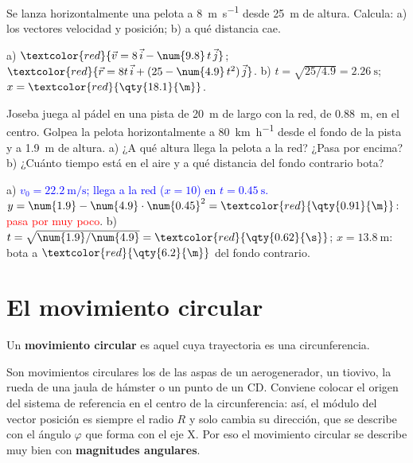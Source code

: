 \begin{exercise}
    Se lanza horizontalmente una pelota a \qty{8}{\m\per\s} desde \qty{25}{\m} de altura. Calcula: a) los vectores velocidad y
    posición; b) a qué distancia cae.
    \begin{solu}
        a) \(\textcolor{red}{\vec v = 8\,\ivec - \num{9.8}\,t\,\jvec}\); \(\textcolor{red}{\vec r = 8t\,\ivec + (25 - \num{4.9}\,t^2)\,\jvec}\).
        b) \(t = \sqrt{25/\num{4.9}} = \qty{2.26}{\s}\); \(x = \textcolor{red}{\qty{18.1}{\m}}\).
    \end{solu}
\end{exercise}

\begin{exercise}
    Joseba juega al pádel en una pista de \qty{20}{\m} de largo con la red, de \qty{0.88}{\m}, en el centro. Golpea la pelota
    horizontalmente a \qty{80}{\km\per\hour} desde el fondo de la pista y a \qty{1.9}{\m} de altura. a) ¿A qué altura llega la
    pelota a la red? ¿Pasa por encima? b) ¿Cuánto tiempo está en el aire y a qué distancia del fondo contrario bota?
    \begin{solu}
        a) \textcolor{blue}{\(v_0 = \qty{22.2}{\m\per\s}\); llega a la red (\(x = 10\)) en \(t = \qty{0.45}{\s}\).}
        \(y = \num{1.9} - \num{4.9} \cdot \num{0.45}^2 = \textcolor{red}{\qty{0.91}{\m}}\): \textcolor{red}{pasa por muy poco}.
        b) \(t = \sqrt{\num{1.9}/\num{4.9}} = \textcolor{red}{\qty{0.62}{\s}}\); \(x = \qty{13.8}{\m}\): bota a
        \(\textcolor{red}{\qty{6.2}{\m}}\) del fondo contrario.
    \end{solu}
\end{exercise}

\section{El movimiento circular}\label{sec:ud9-circular}

\begin{definition}
    Un \textbf{movimiento circular} es aquel cuya trayectoria es una circunferencia.
\end{definition}

Son movimientos circulares los de las aspas de un aerogenerador, un tiovivo, la rueda de una jaula de hámster o un punto de un CD.
Conviene colocar el origen del sistema de referencia en el centro de la circunferencia: así, el módulo del vector posición es
siempre el radio \(R\) y solo cambia su dirección, que se describe con el ángulo \(\varphi\) que forma con el eje X. Por eso el
movimiento circular se describe muy bien con \textbf{magnitudes angulares}.


